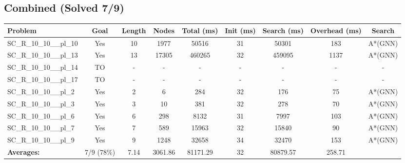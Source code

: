 \documentclass{article}
\begin{document}
\subsection*{Combined (Solved 7/9)}
\begin{tabular}{lcccccccc}
\toprule
Problem & Goal & Length & Nodes & Total (ms) & Init (ms) & Search (ms) & Overhead (ms) & Search \\
\midrule
SC\_R\_10\_10\_\_pl\_10 & Yes & 10 & 1977 & 50516 & 31 & 50301 & 183 & A*(GNN) \\
SC\_R\_10\_10\_\_pl\_13 & Yes & 13 & 17305 & 460265 & 32 & 459095 & 1137 & A*(GNN) \\
SC\_R\_10\_10\_\_pl\_14 & TO & - & - & - & - & - & - & - \\
SC\_R\_10\_10\_\_pl\_17 & TO & - & - & - & - & - & - & - \\
SC\_R\_10\_10\_\_pl\_2 & Yes & 2 & 6 & 284 & 32 & 176 & 75 & A*(GNN) \\
SC\_R\_10\_10\_\_pl\_3 & Yes & 3 & 10 & 381 & 32 & 278 & 70 & A*(GNN) \\
SC\_R\_10\_10\_\_pl\_6 & Yes & 6 & 298 & 8132 & 31 & 7997 & 103 & A*(GNN) \\
SC\_R\_10\_10\_\_pl\_7 & Yes & 7 & 589 & 15963 & 32 & 15840 & 90 & A*(GNN) \\
SC\_R\_10\_10\_\_pl\_9 & Yes & 9 & 1248 & 32658 & 34 & 32470 & 153 & A*(GNN) \\
\textbf{Averages:} & 7/9 (78\%) & 7.14 & 3061.86 & 81171.29 & 32 & 80879.57 & 258.71 & \\
\bottomrule
\end{tabular}
\\[0.7cm]
\end{document}
